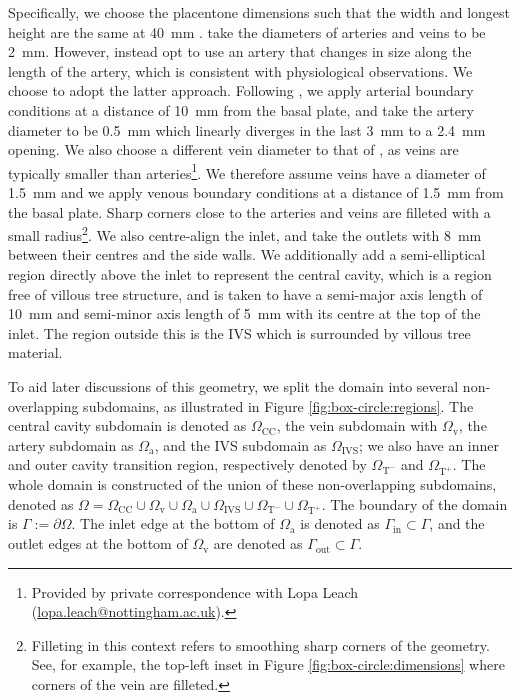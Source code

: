             Specifically, we choose the placentone dimensions such that the width and longest height are the same at \qty{40}{\milli\metre}   \cite{chernyavskyMathematicalModelIntervillous2010,lecarpentierComputationalFluidDynamic2016}. \citeauthor{lecarpentierComputationalFluidDynamic2016} \cite{lecarpentierComputationalFluidDynamic2016} take the diameters of arteries and veins to be \qty{2}{\milli\metre}. However, \citeauthor{burtonRheologicalPhysiologicalConsequences2009} \cite{burtonRheologicalPhysiologicalConsequences2009} instead opt to use an artery that changes in size along the length of the artery, which is consistent with physiological observations. We choose to adopt the latter approach. Following \cite{burtonRheologicalPhysiologicalConsequences2009}, we apply arterial boundary conditions at a distance of \qty{10}{\milli\metre} from the basal plate, and take the artery diameter to be \qty{0.5}{\milli\metre} which linearly diverges in the last \qty{3}{\milli\metre} to a \qty{2.4}{\milli\metre} opening. We also choose a different vein diameter to that of \cite{chernyavskyMathematicalModelIntervillous2010}, as veins are typically smaller than arteries\footnote{Provided by private correspondence with Lopa Leach (\href{mailto:lopa.leach@nottingham.ac.uk}{lopa.leach@nottingham.ac.uk}).}. We therefore assume veins have a diameter of \qty{1.5}{\milli\metre} and we apply venous boundary conditions at a distance of \qty{1.5}{\milli\metre} from the basal plate. Sharp corners close to the arteries and veins are filleted with a small radius\footnote{Filleting in this context refers to smoothing sharp corners of the geometry. See, for example, the top-left inset in Figure \ref{fig:box-circle:dimensions} where corners of the vein are filleted.}. We also centre-align the inlet, and take the outlets with \qty{8}{\milli\metre} between their centres and the side walls. We additionally add a semi-elliptical region directly above the inlet to represent the central cavity, which is a region free of villous tree structure, and is taken to have a semi-major axis length of \qty{10}{\milli\meter} and semi-minor axis length of \qty{5}{\milli\meter} with its centre at the top of the inlet. The region outside this is the IVS which is surrounded by villous tree material. 
            
            To aid later discussions of this geometry, we split the domain into several non-overlapping subdomains, as illustrated in Figure \ref{fig:box-circle:regions}. The central cavity subdomain is denoted as $\Omega_\text{CC}$, the vein subdomain with $\Omega_\text{v}$, the artery subdomain as $\Omega_\text{a}$, and the IVS subdomain as $\Omega_\text{IVS}$; we also have an inner and outer cavity transition region, respectively denoted by $\Omega_{\text{T}^-}$ and $\Omega_{\text{T}^+}$. The whole domain is constructed of the union of these non-overlapping subdomains, denoted as $\Omega = \Omega_\text{CC} \cup \Omega_\text{v} \cup \Omega_\text{a} \cup \Omega_\text{IVS} \cup \Omega_{\text{T}^-} \cup \Omega_{\text{T}^+}$. The boundary of the domain is $\Gamma := \partial\Omega$. The inlet edge at the bottom of $\Omega_\text{a}$ is denoted as $\Gamma_\text{in} \subset \Gamma$, and the outlet edges at the bottom of $\Omega_\text{v}$ are denoted as $\Gamma_\text{out} \subset \Gamma$.

